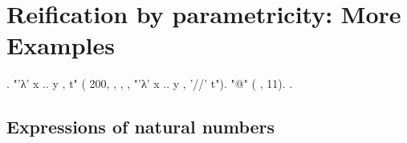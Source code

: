 \begin{coqdoccode}
\end{coqdoccode}
\section{Reification by parametricity: More Examples}

\begin{coqdoccode}
\coqdocnoindent
{}  .\coqdoceol
\coqdocnoindent
{} "'λ' x .. y , t"\coqdoceol
\coqdocindent{4.50em}
(  200,  ,  ,  ,\coqdoceol
\coqdocindent{5.00em}
 "'λ'  x .. y , '//' t").\coqdoceol
\coqdocnoindent
{}  "@" ( ,   11).\coqdoceol
\coqdocemptyline
\coqdocnoindent
{}  .\coqdoceol
\end{coqdoccode}
\subsection{Expressions of natural numbers}

